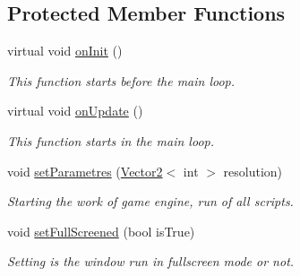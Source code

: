 \subsection*{Protected Member Functions}
\begin{DoxyCompactItemize}
\item 
\hypertarget{class_virtual_1_1_device_acf167a3fc503db0b87bab4435bfef1ed}{}\label{class_virtual_1_1_device_acf167a3fc503db0b87bab4435bfef1ed} 
virtual void \hyperlink{class_virtual_1_1_device_acf167a3fc503db0b87bab4435bfef1ed}{on\+Init} ()
\begin{DoxyCompactList}\small\item\em This function starts before the main loop. \end{DoxyCompactList}\item 
\hypertarget{class_virtual_1_1_device_abbf3596a61ffc42d8b0a533f07e892a7}{}\label{class_virtual_1_1_device_abbf3596a61ffc42d8b0a533f07e892a7} 
virtual void \hyperlink{class_virtual_1_1_device_abbf3596a61ffc42d8b0a533f07e892a7}{on\+Update} ()
\begin{DoxyCompactList}\small\item\em This function starts in the main loop. \end{DoxyCompactList}\item 
void \hyperlink{class_virtual_1_1_device_a15e199ed381e9cf1eea79ce2da30786e}{set\+Parametres} (\hyperlink{struct_virtual_1_1_vector2}{Vector2}$<$ int $>$ resolution)
\begin{DoxyCompactList}\small\item\em Starting the work of game engine, run of all scripts. \end{DoxyCompactList}\item 
void \hyperlink{class_virtual_1_1_device_a7f0a80fead7847616b92d0defad43d96}{set\+Full\+Screened} (bool is\+True)
\begin{DoxyCompactList}\small\item\em Setting is the window run in fullscreen mode or not. \end{DoxyCompactList}\end{DoxyCompactItemize}
